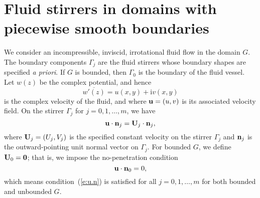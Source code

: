 \documentclass[11pt,a4paper]{article}
\renewcommand{\i}{\mathrm{i}}
\renewcommand{\i}{\mathrm{i}}
\newcommand{\bu}{{\bf u}}
\newcommand{\bU}{{\bf U}}
\newcommand{\bn}{{\bf n}}
\begin{document}
\section{Fluid stirrers in domains with piecewise smooth boundaries}
\label{sc:prob}

We consider an incompressible, inviscid, irrotational fluid flow in the domain $G$. The boundary components $\Gamma_j$ are the fluid stirrers whose boundary shapes are specified \textit{a priori}. If $G$ is bounded, then $\Gamma_0$ is the boundary of the fluid vessel. Let $w(z)$ be the complex potential, and hence 
\[
\overline{w'(z)}=u(x,y)+\i v(x,y) 
\]
is the complex velocity of the fluid, and where $\bu=(u,v)$ is its associated velocity field.
On the stirrer $\Gamma_j$ for $j=0,1,\ldots,m$, we have~\cite{cro-str,fin}
\begin{equation}\label{e:u.n}
\bu\cdot\bn_j=\bU_j\cdot\bn_j, 
\end{equation}
where $\bU_j=(U_j,V_j)$ is the specified constant velocity on the stirrer $\Gamma_j$ and $\bn_j$ is the outward-pointing unit normal vector on $\Gamma_j$. For bounded $G$, we define $\bU_0={\bf 0}$; that is, we impose the no-penetration condition~\cite{fin}
\begin{equation}\label{e:u.n-0}
\bu\cdot\bn_0=0,
\end{equation}
which means condition~(\ref{e:u.n}) is satisfied for all $j=0,1,\ldots,m$ for both bounded and unbounded $G$.
\end{document}

